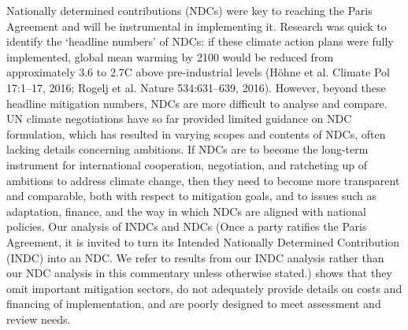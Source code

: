 Nationally determined contributions (NDCs) were key to reaching the Paris Agreement and will be instrumental in implementing it. Research was quick to identify the `headline numbers' of NDCs: if these climate action plans were fully implemented, global mean warming by 2100 would be reduced from approximately 3.6 to 2.7{\textdegree}C above pre-industrial levels (H{\"o}hne et al. Climate Pol 17:1--17, 2016; Rogelj et al. Nature 534:631--639, 2016). However, beyond these headline mitigation numbers, NDCs are more difficult to analyse and compare. UN climate negotiations have so far provided limited guidance on NDC formulation, which has resulted in varying scopes and contents of NDCs, often lacking details concerning ambitions. If NDCs are to become the long-term instrument for international cooperation, negotiation, and ratcheting up of ambitions to address climate change, then they need to become more transparent and comparable, both with respect to mitigation goals, and to issues such as adaptation, finance, and the way in which NDCs are aligned with national policies. Our analysis of INDCs and NDCs (Once a party ratifies the Paris Agreement, it is invited to turn its Intended Nationally Determined Contribution (INDC) into an NDC. We refer to results from our INDC analysis rather than our NDC analysis in this commentary unless otherwise stated.) shows that they omit important mitigation sectors, do not adequately provide details on costs and financing of implementation, and are poorly designed to meet assessment and review needs.